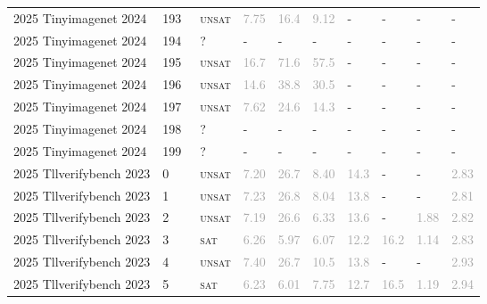 \begin{center}
{\begin{longtable}{@{}llllllllll@{}}
2025 Tinyimagenet 2024 & 193 & ~\textsc{unsat} & \textcolor{darkgray}{7.75} & \textcolor{darkgray}{16.4} & \textcolor{darkgray}{9.12} & - & - & - & - \\
2025 Tinyimagenet 2024 & 194 & ~? & - & - & - & - & - & - & - \\
2025 Tinyimagenet 2024 & 195 & ~\textsc{unsat} & \textcolor{darkgray}{16.7} & \textcolor{darkgray}{71.6} & \textcolor{darkgray}{57.5} & - & - & - & - \\
2025 Tinyimagenet 2024 & 196 & ~\textsc{unsat} & \textcolor{darkgray}{14.6} & \textcolor{darkgray}{38.8} & \textcolor{darkgray}{30.5} & - & - & - & - \\
2025 Tinyimagenet 2024 & 197 & ~\textsc{unsat} & \textcolor{darkgray}{7.62} & \textcolor{darkgray}{24.6} & \textcolor{darkgray}{14.3} & - & - & - & - \\
2025 Tinyimagenet 2024 & 198 & ~? & - & - & - & - & - & - & - \\
2025 Tinyimagenet 2024 & 199 & ~? & - & - & - & - & - & - & - \\
\midrule
2025 Tllverifybench 2023 & 0 & ~\textsc{unsat} & \textcolor{darkgray}{7.20} & \textcolor{darkgray}{26.7} & \textcolor{darkgray}{8.40} & \textcolor{darkgray}{14.3} & - & - & \textcolor{darkgray}{2.83} \\
2025 Tllverifybench 2023 & 1 & ~\textsc{unsat} & \textcolor{darkgray}{7.23} & \textcolor{darkgray}{26.8} & \textcolor{darkgray}{8.04} & \textcolor{darkgray}{13.8} & - & - & \textcolor{darkgray}{2.81} \\
2025 Tllverifybench 2023 & 2 & ~\textsc{unsat} & \textcolor{darkgray}{7.19} & \textcolor{darkgray}{26.6} & \textcolor{darkgray}{6.33} & \textcolor{darkgray}{13.6} & - & \textcolor{darkgray}{1.88} & \textcolor{darkgray}{2.82} \\
2025 Tllverifybench 2023 & 3 & ~\textsc{sat} & \textcolor{darkgray}{6.26} & \textcolor{darkgray}{5.97} & \textcolor{darkgray}{6.07} & \textcolor{darkgray}{12.2} & \textcolor{darkgray}{16.2} & \textcolor{darkgray}{1.14} & \textcolor{darkgray}{2.83} \\
2025 Tllverifybench 2023 & 4 & ~\textsc{unsat} & \textcolor{darkgray}{7.40} & \textcolor{darkgray}{26.7} & \textcolor{darkgray}{10.5} & \textcolor{darkgray}{13.8} & - & - & \textcolor{darkgray}{2.93} \\
2025 Tllverifybench 2023 & 5 & ~\textsc{sat} & \textcolor{darkgray}{6.23} & \textcolor{darkgray}{6.01} & \textcolor{darkgray}{7.75} & \textcolor{darkgray}{12.7} & \textcolor{darkgray}{16.5} & \textcolor{darkgray}{1.19} & \textcolor{darkgray}{2.94} \\

\end{longtable}}
\end{center}
